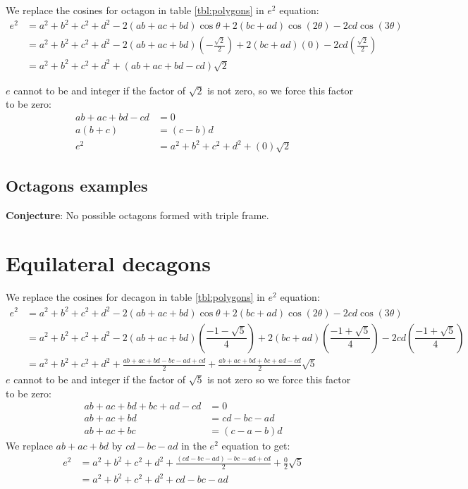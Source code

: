 \documentclass[11pt]{article}
\begin{document}
We replace the cosines for octagon in table \ref{tbl:polygons} in $e^2$ equation:
\begin{align}
e^2 &= a^2 +b^2 +c^2 +d^2 -2(ab+ac+bd)\cos\theta +2(bc+ad)\cos(2\theta) -2cd\cos(3\theta) \nonumber\\
 &= a^2 +b^2 +c^2 +d^2 
 -2(ab+ac+bd)\left(-\frac{\sqrt{2}}{2}\right) 
 +2(bc+ad)\left(0\right) 
 -2cd\left(\frac{\sqrt{2}}{2}\right) \nonumber\\
 &= a^2 +b^2 +c^2 +d^2 +(ab +ac +bd -cd)\sqrt{2}
\end{align} 

$e$ cannot to be and integer if the factor of $\sqrt{2}$ is not zero, so we force this factor to be zero:
\begin{align*}
ab + ac + bd - cd &= 0 \\
a(b+c) &= (c-b)d \\
e^2 &= a^2 +b^2 +c^2 +d^2 + (0)\sqrt{2}
\end{align*}



\subsection{Octagons examples}

\textbf{Conjecture}: No possible octagons formed with triple frame.

\section{Equilateral decagons}

We replace the cosines for decagon in table \ref{tbl:polygons} in $e^2$ equation:
\begin{align}
e^2 &= a^2 +b^2 +c^2 +d^2 -2(ab+ac+bd)\cos\theta +2(bc+ad)\cos(2\theta) -2cd\cos(3\theta) \nonumber\\
 &= a^2 +b^2 +c^2 +d^2
  -2(ab+ac+bd)\left(\dfrac{-1-\sqrt{5}}{4}\right)
  +2(bc+ad)\left(\dfrac{-1+\sqrt{5}}{4}\right)
  -2cd\left(\dfrac{-1+\sqrt{5}}{4}\right) \nonumber\\
 &= a^2 +b^2 +c^2 +d^2 +\frac{ab+ac+bd -bc-ad +cd}{2} +\frac{ab+ac+bd +bc+ad -cd}{2}\sqrt{5}
\end{align}
$e$ cannot to be and integer if the factor of $\sqrt{5}$ is not zero so we force this factor to be zero:
\begin{align}
 ab+ac+bd +bc+ad -cd &= 0\nonumber\\
 ab+ac+bd &= cd -bc-ad \\
 ab+ac+bc &= (c -a -b)d
\end{align}
We replace $ab+ac+bd$ by $cd -bc-ad$ in the $e^2$ equation to get:
\begin{align}
e^2 &= a^2 +b^2 +c^2 +d^2 +\frac{(cd -bc-ad) -bc-ad+cd}{2} +\frac{0}{2}\sqrt{5} \nonumber\\
 &= a^2 +b^2 +c^2 +d^2 + cd -bc -ad\nonumber
\end{align}
\end{document}
